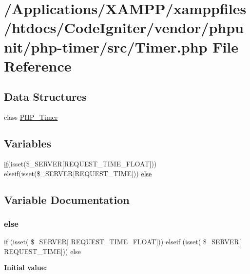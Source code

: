 \hypertarget{_timer_8php}{}\section{/\+Applications/\+X\+A\+M\+P\+P/xamppfiles/htdocs/\+Code\+Igniter/vendor/phpunit/php-\/timer/src/\+Timer.php File Reference}
\label{_timer_8php}
\subsection*{Data Structures}
\begin{DoxyCompactItemize}
\item 
class \mbox{\hyperlink{class_p_h_p___timer}{P\+H\+P\+\_\+\+Timer}}
\end{DoxyCompactItemize}
\subsection*{Variables}
\begin{DoxyCompactItemize}
\item 
\mbox{\hyperlink{_test_test_8php_a107bc088eea0dce8972b45c841f5ff9c}{if}}(isset(\$\+\_\+\+S\+E\+R\+V\+ER\mbox{[}\textquotesingle{}R\+E\+Q\+U\+E\+S\+T\+\_\+\+T\+I\+M\+E\+\_\+\+F\+L\+O\+AT\textquotesingle{}\mbox{]})) elseif(isset(\$\+\_\+\+S\+E\+R\+V\+ER\mbox{[}\textquotesingle{}R\+E\+Q\+U\+E\+S\+T\+\_\+\+T\+I\+ME\textquotesingle{}\mbox{]})) \mbox{\hyperlink{_timer_8php_a85e12ef37ab7ccdc85a214550a7e5d9d}{else}}
\end{DoxyCompactItemize}


\subsection{Variable Documentation}
\mbox{\label{_timer_8php_a85e12ef37ab7ccdc85a214550a7e5d9d}} 
\subsubsection{\texorpdfstring{else}{else}}
{\footnotesize\ttfamily \mbox{\hyperlink{_test_test_8php_a107bc088eea0dce8972b45c841f5ff9c}{if}} (isset( \$\+\_\+\+S\+E\+R\+V\+ER\mbox{[} \textquotesingle{}R\+E\+Q\+U\+E\+S\+T\+\_\+\+T\+I\+M\+E\+\_\+\+F\+L\+O\+AT\textquotesingle{}\mbox{]})) elseif (isset( \$\+\_\+\+S\+E\+R\+V\+ER\mbox{[} \textquotesingle{}R\+E\+Q\+U\+E\+S\+T\+\_\+\+T\+I\+ME\textquotesingle{}\mbox{]})) else}

{\bfseries Initial value\+:}
